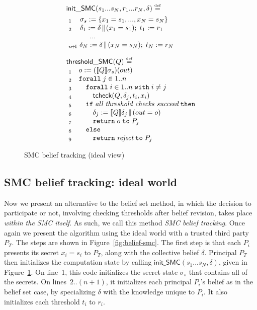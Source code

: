 \documentclass[10pt]{sigplanconf}
\newcommand{\kw}[1]{\mathtt{#1}}
\newcommand{\polc}{\textsf{tcheck}}
\begin{document}
\begin{figure}[t]
\[
\begin{array}{l}
\mathsf{init\_SMC}(s_1...s_N,r_1...r_N,\delta) \defeq \\
\\[-2ex]
~_1\quad\, \sigma_s := \{ x_1 = s_1, ..., x_N = s_N \} \\
~_2\quad\, \delta_1 := \revise{\delta}{(x_1 = s_1)};\; t_1 := r_1 \\
~~~~~~~~~~... \\
~_{n\!+\!1}\; \delta_N := \revise{\delta}{(x_N = s_N)};\; t_N := r_N \\
\\
\mathsf{threshold\_SMC}(Q) \defeq \\
~_1\quad o := (\pevalp{Q}{\sigma_s})(out) \\
~_2\quad \kw{forall}\;j \in 1..n \\
~_3\quad\quad \kw{forall}\;i \in 1..n\; \kw{with}\; i \not= j \\
~_4\quad\quad\quad \polc(Q,\delta_j,t_i,x_i) \\
~_5\quad\quad \kw{if}\; \emph{all threshold checks succeed}\; \kw{then} \\
~_6\quad\quad\quad \delta_j := \revise{\pevalp{Q}{\delta_j}}{(out = o)} \\
~_7\quad\quad\quad \kw{return}\;o\;\kw{to}\;P_j \\
~_8\quad\quad \kw{else} \\
~_9\quad\quad\quad \kw{return}\;\emph{reject}\;\kw{to}\;P_j
\end{array}\]
\caption{SMC belief tracking (ideal view)} \label{fig:threshold-mc-alg}
\end{figure}

\subsection{SMC belief tracking: ideal world}
\label{sec:SMC-belief-tracking}
Now we present an alternative to the belief set method, in which the
decision to participate or not, involving checking thresholds after
belief revision, takes place \emph{within the SMC itself}.  As such,
we call this method \emph{SMC belief tracking}.
Once again we present the algorithm using the ideal world with a
trusted third party $P_T$.  The steps are shown in
Figure~\ref{fig:belief-smc}.  The first step is that each $P_i$
presents its secret $x_i = s_i$ to $P_T$, along with the collective
belief $\delta$.  Principal $P_T$ then initializes the computation state by
calling $\mathsf{init\_SMC}(s_1...s_N,\delta)$, given in
Figure~\ref{fig:threshold-mc-alg}.  On line~1, this code initializes
the secret state $\sigma_s$ that contains all of the secrets.  On
lines~$2..(n\!+\!1)$, it initializes each principal $P_i$'s belief
as in the belief set case, by specializing $\delta$ with the
knowledge unique to $P_i$.  It also initializes each threshold $t_i$ to
$r_i$.
\end{document}
